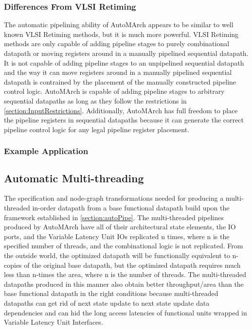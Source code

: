 \subsubsection{Differences From VLSI Retiming}
The automatic pipelining ability of AutoMArch appears to be similar to well known VLSI Retiming methods, but it is much more powerful. VLSI Retiming methods are only capable of adding pipeline stages to purely combinational datapath or moving registers around in a manually pipelined sequential datapath. It is not capable of adding pipeline stages to an unpipelined sequential datapath and the way it can move registers around in a manually pipelined sequential datapath is contrained by the placement of the manually constructed pipeline control logic. AutoMArch is capable of adding pipeline stages to arbitrary sequential datapaths as long as they follow the restrictions in \ref{section:InputRestrictions}. Additionally, AutoMArch has full freedom to place the pipeline registers in sequential datapaths because it can generate the correct pipeline control logic for any legal pipeline register placement.

\subsubsection{Example Application}

\subsection{Automatic Multi-threading}
\label{section:autoMult}
The specification and node-graph transformations needed for producing a multi-threaded in-order datapath from a base functional datapath build upon the framework established in \ref{section:autoPipe}. The multi-threaded pipelines produced by AutoMArch have all of their architectural state elements, the IO ports, and the Variable Latency Unit IOs replicated n times, where n is the specified number of threads, and the combinational logic is not replicated. From the outside world, the optimized datapath will be functionally equivalent to n-copies of the original base datapath, but the optimized datapath requires much less than n-times the area, where n is the number of threads. The multi-threaded datapaths produced in this manner also obtain better throughput/area than the base functional datapath in the right conditions because multi-threaded datapaths can get rid of next state update to next state update data dependencies and can hid the long access latencies of functional units wrapped in Variable Latency Unit Interfaces.

